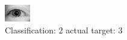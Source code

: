 \begin{figure}[h!]
\begin{center}
\includegraphics[width=0.60\columnwidth]{figures/ID3097_class_2_target_3.png}
\end{center}
\caption{ Classification: 2 actual target: 3}
\label{fig:ID3097_class_2_target_3}
\end{figure}
